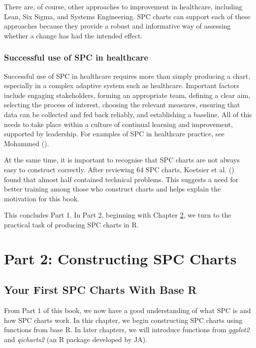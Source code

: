 \documentclass[
]{book}
\begin{document}
There are, of course, other approaches to improvement in healthcare, including Lean, Six Sigma, and Systems Engineering. SPC charts can support each of these approaches because they provide a robust and informative way of assessing whether a change has had the intended effect.

\section{Successful use of SPC in healthcare}\label{successful-use-of-spc-in-healthcare}

Successful use of SPC in healthcare requires more than simply producing a chart, especially in a complex adaptive system such as healthcare. Important factors include engaging stakeholders, forming an appropriate team, defining a clear aim, selecting the process of interest, choosing the relevant measures, ensuring that data can be collected and fed back reliably, and establishing a baseline. All of this needs to take place within a culture of continual learning and improvement, supported by leadership. For examples of SPC in healthcare practice, see Mohammed ().

At the same time, it is important to recognise that SPC charts are not always easy to construct correctly. After reviewing 64 SPC charts, Koetsier et al. () found that almost half contained technical problems. This suggests a need for better training among those who construct charts and helps explain the motivation for this book.

This concludes Part 1. In Part 2, beginning with Chapter \ref{first-chart}, we turn to the practical task of producing SPC charts in R.

\part*{Part 2: Constructing SPC Charts}\label{part-part-2-constructing-spc-charts}

\chapter{Your First SPC Charts With Base R}\label{first-chart}

From Part 1 of this book, we now have a good understanding of what SPC is and how SPC charts work. In this chapter, we begin constructing SPC charts using functions from base R. In later chapters, we will introduce functions from \emph{ggplot2} and \emph{qicharts2} (an R package developed by JA).
\end{document}
